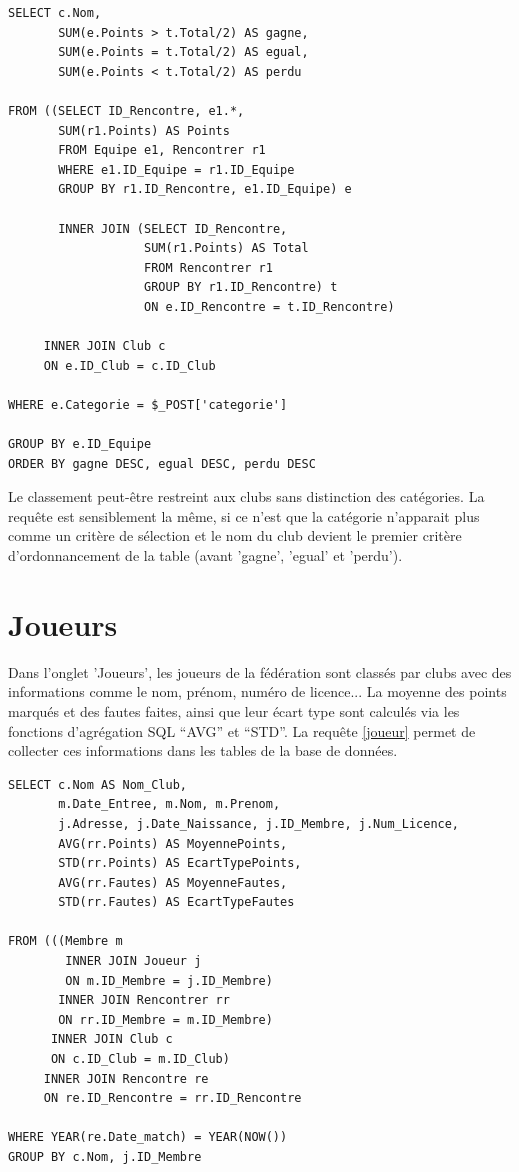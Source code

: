 \documentclass[a4paper,8pt,french,fleqn]{report}
\begin{document}
\begin{lstlisting}
SELECT c.Nom,
       SUM(e.Points > t.Total/2) AS gagne,
       SUM(e.Points = t.Total/2) AS egual,
       SUM(e.Points < t.Total/2) AS perdu
			
FROM ((SELECT ID_Rencontre, e1.*,
       SUM(r1.Points) AS Points
       FROM Equipe e1, Rencontrer r1
       WHERE e1.ID_Equipe = r1.ID_Equipe
       GROUP BY r1.ID_Rencontre, e1.ID_Equipe) e 
                
       INNER JOIN (SELECT ID_Rencontre,
                   SUM(r1.Points) AS Total
                   FROM Rencontrer r1
                   GROUP BY r1.ID_Rencontre) t
                   ON e.ID_Rencontre = t.ID_Rencontre)
 
     INNER JOIN Club c
     ON e.ID_Club = c.ID_Club
			  
WHERE e.Categorie = $_POST['categorie']

GROUP BY e.ID_Equipe
ORDER BY gagne DESC, egual DESC, perdu DESC
\end{lstlisting}

Le classement peut-être restreint aux clubs sans distinction des catégories. La requête est sensiblement la même, si ce n'est que la catégorie n'apparait plus comme un critère de sélection et le nom du club devient le premier critère d'ordonnancement de la table (avant 'gagne', 'egual' et 'perdu'). 


\section{Joueurs}
Dans l'onglet 'Joueurs', les joueurs de la fédération sont classés par clubs avec des informations comme le nom, prénom, numéro de licence... La moyenne des points marqués et des fautes faites, ainsi que leur écart type sont calculés via les fonctions d'agrégation SQL ``AVG'' et ``STD''. La requête \ref{joueur} permet de collecter ces informations dans les tables de la base de données.

\begin{lstlisting}
SELECT c.Nom AS Nom_Club, 
       m.Date_Entree, m.Nom, m.Prenom, 
       j.Adresse, j.Date_Naissance, j.ID_Membre, j.Num_Licence,
       AVG(rr.Points) AS MoyennePoints,
       STD(rr.Points) AS EcartTypePoints,
       AVG(rr.Fautes) AS MoyenneFautes,
       STD(rr.Fautes) AS EcartTypeFautes

FROM (((Membre m 
        INNER JOIN Joueur j
        ON m.ID_Membre = j.ID_Membre) 
       INNER JOIN Rencontrer rr
       ON rr.ID_Membre = m.ID_Membre)
      INNER JOIN Club c
      ON c.ID_Club = m.ID_Club)
     INNER JOIN Rencontre re
     ON re.ID_Rencontre = rr.ID_Rencontre

WHERE YEAR(re.Date_match) = YEAR(NOW())
GROUP BY c.Nom, j.ID_Membre
\end{lstlisting}
\end{document}
